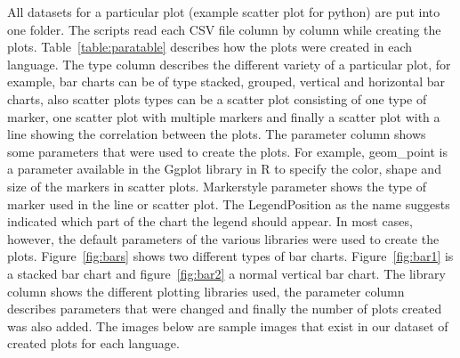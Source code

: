 \documentclass[12pt, a4paper,oneside]{report}
\begin{document}
All datasets for a particular plot (example scatter plot for python) are put into one folder. The scripts read each CSV file column by column while creating the plots. Table~\ref{table:paratable} describes how the plots were created in each language. The type column describes the different variety of a particular plot, for example, bar charts can be of type stacked, grouped, vertical and horizontal bar charts, also scatter plots types can be a scatter plot consisting of one type of marker, one scatter plot with multiple markers and finally a scatter plot with a line showing the correlation between the plots. The parameter column shows some parameters that were used to create the plots. For example, geom\_point is a parameter available in the Ggplot library in R to specify the color, shape and size of the markers in scatter plots.  Markerstyle parameter shows the type of marker used in the line or scatter plot. The LegendPosition as the name suggests indicated which part of the chart the legend should appear. In most cases, however, the default parameters of the various libraries were used to create the plots. Figure~\ref{fig:bars} shows two different types of bar charts. Figure~\ref{fig:bar1} is a stacked bar chart and figure~\ref{fig:bar2} a normal vertical bar chart. The library column shows the different plotting libraries used, the parameter column describes parameters that were changed and finally the number of plots created was also added. The images below are sample images that exist in our dataset of created plots for each language. 
\end{document}
